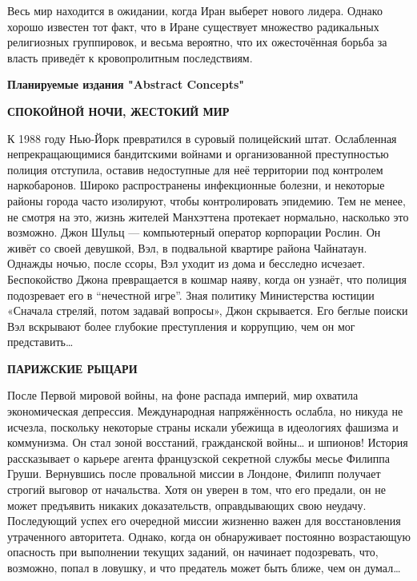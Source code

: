 \documentclass[a5paper, 9pt,
final, openany, twoside=true]{memoir}
\begin{document}
Весь мир находится в ожидании, когда Иран выберет нового лидера. Однако хорошо известен тот факт, что в Иране существует множество радикальных религиозных группировок, и весьма вероятно, что их ожесточённая борьба за власть приведёт к кровопролитным последствиям.

\newpage


\vspace*{3\baselineskip}

\noindent
{\sffamily\bfseries\Large
    Планируемые издания "Abstract Concepts"\bigskip
}
\newline\newline

\noindent
{\sffamily\bfseries\Large
    СПОКОЙНОЙ НОЧИ, ЖЕСТОКИЙ МИР\bigskip
}

\noindent
К 1988 году Нью-Йорк превратился в суровый полицейский штат. Ослабленная непрекращающимися бандитскими войнами и организованной преступностью полиция отступила, оставив недоступные для неё территории под контролем наркобаронов. Широко распространены инфекционные болезни, и некоторые районы города часто изолируют, чтобы контролировать эпидемию. Тем не менее, не смотря на это, жизнь жителей Манхэттена протекает нормально, насколько это возможно.
Джон Шульц — компьютерный оператор корпорации Рослин. Он живёт со своей девушкой, Вэл, в подвальной квартире района Чайнатаун.
Однажды ночью, после ссоры, Вэл уходит из дома и бесследно исчезает. Беспокойство Джона превращается в кошмар наяву, когда он узнаёт, что полиция подозревает его в ``нечестной игре''. Зная политику Министерства юстиции «Сначала стреляй, потом задавай вопросы», Джон скрывается.
Его беглые поиски Вэл вскрывают более глубокие преступления и коррупцию, чем он мог представить…
\newline\newline

\noindent
{\sffamily\bfseries\Large
    ПАРИЖСКИЕ РЫЦАРИ\bigskip
}

\noindent
После Первой мировой войны, на фоне распада империй, мир охватила экономическая депрессия. Международная напряжённость ослабла, но никуда не исчезла, поскольку некоторые страны искали убежища в идеологиях фашизма и коммунизма.
Он стал зоной восстаний, гражданской войны… и шпионов!
История рассказывает о карьере агента французской секретной службы месье Филиппа Груши. Вернувшись после провальной миссии в Лондоне, Филипп получает строгий выговор от начальства. Хотя он уверен в том, что его предали, он не может предъявить никаких доказательств, оправдывающих свою неудачу. Последующий успех его очередной миссии жизненно важен для восстановления утраченного авторитета. Однако, когда он обнаруживает постоянно возрастающую опасность при выполнении текущих заданий, он начинает подозревать, что, возможно, попал в ловушку, и что предатель может быть ближе, чем он думал…
\end{document}
